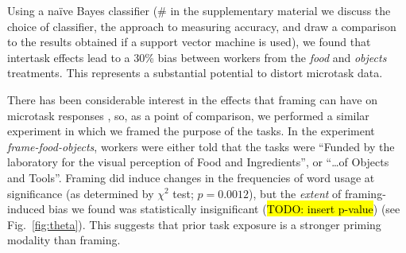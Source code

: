 \documentclass[12pt]{article}
\newcommand{\td}[1]{{\color{blu}\hl{TODO: #1}}}
\begin{document}
%
%
%
%
%
%
%
%

Using a na\"ive Bayes classifier (\# in the 
supplementary material we discuss the choice of classifier, the
approach to measuring accuracy, and draw a comparison to the results obtained 
if a support vector machine is used), we found that intertask effects 
lead to a 30\% bias between workers from the \textit{food} and 
\textit{objects} treatments.  This represents a substantial potential to 
distort microtask data.

There has been considerable interest in the effects that framing can have
on microtask responses
\cite{Kinnaird2012281,chandler2013breaking,thibodeau2013natural}, so,
as a point of comparison, we performed a similar experiment 
in which we framed the purpose of the tasks.  In the experiment 
\textit{frame-food-objects}, workers were either told that 
the tasks were ``Funded by the laboratory for the visual perception of Food 
and Ingredients'', or ``\ldots of Objects and Tools''.  
Framing did induce changes in the frequencies of 
word usage at significance (as determined by $\chi^2$ test; $p=0.0012$), but 
the \textit{extent} of framing-induced bias we found was statistically 
insignificant (\td{insert p-value})
(see Fig.~\ref{fig:theta}).  This suggests 
that prior task exposure is a stronger priming modality than framing.
\end{document}
